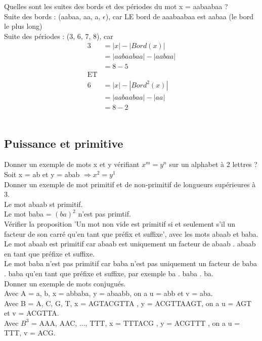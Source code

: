 \documentclass[11pt,a4paper]{article}
\begin{document}
	Quelles sont les suites des bords et des périodes du mot x = aabaabaa ?\\
	Suite des bords : (aabaa, aa, a, $\epsilon$), car LE bord de aaabaabaa est aabaa (le bord le plus long)\\
	Suite des périodes : (3, 6, 7, 8), car \begin{align*}
		3 &= |x| - |Bord(x)|\\
		&= |aabaabaa| - |aabaa|\\
		&= 8 - 5\\
		\text{ET}&\\
		6 &= |x| - |Bord^{2}(x)|\\
		&= |aabaabaa| - |aa|\\
		&= 8 - 2
	\end{align*}\\
	
	\subsection{Puissance et primitive}
	
	Donner un exemple de mots x et y vérifiant $x^m = y^n$ sur un alphabet à 2 lettres ?\\
	Soit x = ab et y = abab $\Rightarrow x^2 = y^1$\\
	
	Donner un exemple de mot primitif et de non-primitif de longueurs supérieures à 3.\\
	Le mot abaab st primitif.\\
	Le mot baba = $(ba)^2$ n'est pas primtif.\\
	
	Vérifier la proposition 'Un mot non vide est primitif si et seulement s'il un facteur de son carré qu'en tant que préfix et suffixe', avec les mots abaab et baba.\\
	Le mot abaab est primitif car abaab est uniquement un facteur de abaab . abaab en tant que préfixe et suffixe.\\
	Le mot baba n'est pas primitif car baba n'est pas uniquement un facteur de baba . baba qu'en tant que préfixe et suffixe, par exemple ba . baba . ba.\\
	
	Donner un exemple de mots conjugués.\\
	Avec A = {a, b}, x = abbaba, y = abaabb, on a u = abb et v = aba.\\
	Avec B = {A, C, G, T}, x = AGTACGTTA , y = ACGTTAAGT, on a u = AGT et v = ACGTTA.\\
	Avec $B^3$ = {AAA, AAC, ..., TTT}, x = TTTACG , y = ACGTTT , on a u = TTT, v = ACG.\\
	
\end{document}

